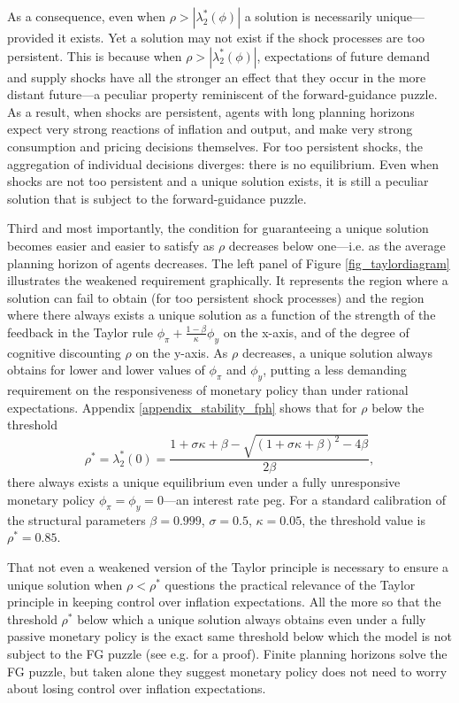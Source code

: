 \documentclass{article}
\begin{document}
As a consequence, even when $\rho>|\lambda_2^*(\phi)|$ a solution is necessarily unique---provided it exists. Yet a solution may not exist if the shock processes are too persistent. This is because when $\rho>|\lambda_2^*(\phi)|$, expectations of future demand and supply shocks have all the stronger an effect that they occur in the more distant future---a peculiar property reminiscent of the forward-guidance puzzle. As a result, when shocks are persistent, agents with long planning horizons expect very strong reactions of inflation and output, and make very strong consumption and pricing decisions themselves. For too persistent shocks, the aggregation of individual decisions diverges: there is no equilibrium. Even when shocks are not too persistent and a unique solution exists, it is still a peculiar solution that is subject to the forward-guidance puzzle.

Third and most importantly, the condition for guaranteeing a unique solution becomes easier and easier to satisfy as $\rho$ decreases below one---i.e. as the average planning horizon of agents decreases. The left panel of Figure \ref{fig_taylordiagram} illustrates the weakened requirement graphically. It represents the region where a solution can fail to obtain (for too persistent shock processes) and the region where there always exists a unique solution as a function of the strength of the feedback in the Taylor rule $\phi_{\pi}+\frac{1-\beta}{\kappa} \phi_y$ on the x-axis, and of the degree of cognitive discounting $\rho$ on the y-axis. As $\rho$ decreases, a unique solution always obtains for lower and lower values of $\phi_{\pi}$ and $\phi_y$, putting a less demanding requirement on the responsiveness of monetary policy than under rational expectations. Appendix \ref{appendix_stability_fph} shows that for $\rho$ below the threshold
\begin{equation}
\rho^* = \lambda_2^*(0) = \frac{1+\sigma \kappa+\beta - \sqrt{(1+\sigma \kappa+\beta)^2-4\beta}}{2\beta},\label{eq_threshold}
\end{equation}
there always exists a unique equilibrium even under a fully unresponsive monetary policy $\phi_{\pi}=\phi_y=0$---an interest rate peg.
For a standard calibration of the structural parameters $\beta = 0.999$, $\sigma = 0.5$, $\kappa = 0.05$, the threshold value is $\rho^*=0.85$.

That not even a weakened version of the Taylor principle is necessary to ensure a unique solution when $\rho<\rho^*$ questions the practical relevance of the Taylor principle in keeping control over inflation expectations. All the more so that the threshold $\rho^*$ below which a unique solution always obtains even under a fully passive monetary policy is the exact same threshold below which the model is not subject to the FG puzzle (see e.g. \cite{FPHIFLAP} for a proof). Finite planning horizons solve the FG puzzle, but taken alone they suggest monetary policy does not need to worry about losing control over inflation expectations.
\end{document}
